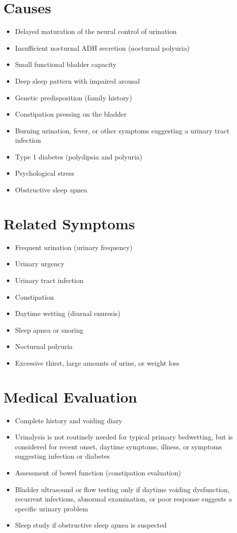 \section*{Causes}
\begin{itemize}
\item Delayed maturation of the neural control of urination
\item Insufficient nocturnal ADH secretion (nocturnal polyuria)
\item Small functional bladder capacity
\item Deep sleep pattern with impaired arousal
\item Genetic predisposition (family history)
\item Constipation pressing on the bladder
\item Burning urination, fever, or other symptoms suggesting a urinary tract infection
\item Type 1 diabetes (polydipsia and polyuria)
\item Psychological stress
\item Obstructive sleep apnea
\end{itemize}

\section*{Related Symptoms}
\begin{itemize}
\item Frequent urination (urinary frequency)
\item Urinary urgency
\item Urinary tract infection
\item Constipation
\item Daytime wetting (diurnal enuresis)
\item Sleep apnea or snoring
\item Nocturnal polyuria
\item Excessive thirst, large amounts of urine, or weight loss
\end{itemize}

\section*{Medical Evaluation}
\begin{itemize}
\item Complete history and voiding diary
\item Urinalysis is not routinely needed for typical primary bedwetting, but is considered for recent onset, daytime symptoms, illness, or symptoms suggesting infection or diabetes
\item Assessment of bowel function (constipation evaluation)
\item Bladder ultrasound or flow testing only if daytime voiding dysfunction, recurrent infections, abnormal examination, or poor response suggests a specific urinary problem
\item Sleep study if obstructive sleep apnea is suspected
\end{itemize}

